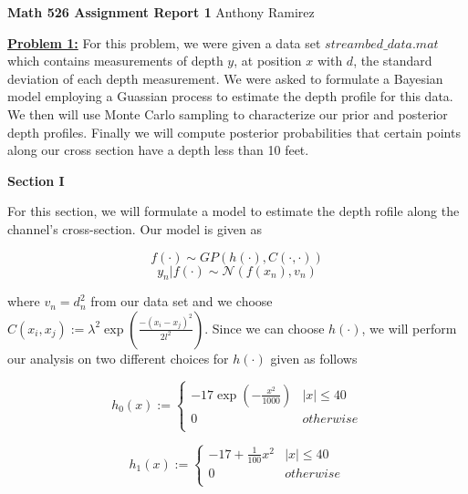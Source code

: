 \documentclass[12pt,leqno]{article}
\begin{document}
	
	\textbf{\large{Math 526} \hspace{0.5in}  \large{Assignment Report 1}}  \hspace{0.5in}  Anthony Ramirez
	
	\vspace{.25in}
	
	\textbf{\underline{Problem 1:}}
	For this problem, we were given a data set $streambed\_data.mat$ which contains measurements of depth $y$, at position $x$ with $d$, the standard deviation of each depth measurement. We were asked to formulate a Bayesian model employing a Guassian process to estimate the depth profile for this data. We then will use Monte Carlo sampling to characterize our prior and posterior depth profiles. Finally we will compute posterior probabilities that certain points along our cross section have a depth less than 10 feet.
	
	\textbf{Section I}
	
	For this section, we will formulate a model to estimate the depth rofile along the channel's cross-section. Our model is given as
	
	\[ f(\cdot) \sim GP\left( h(\cdot), C(\cdot,\cdot) \right) \]
	\[ y_n | f(\cdot) \sim \mathcal{N}(f(x_n),v_n) \]
	
	where $v_n=d_n^2$ from our data set and we choose $C(x_i,x_j):=\lambda^2 \exp\left( \frac{-(x_i-x_j)^2}{2l^2}\right)$. Since we can choose $h(\cdot)$, we will perform our analysis on two different choices for $h(\cdot)$ given as follows
	
	\[ h_0(x) := 
	\begin{cases}
		-17\exp\left( -\frac{x^2}{1000} \right) & |x| \leq 40 \\
		0 & otherwise \\
	\end{cases}
	 \]
	
		\[ h_1(x) := 
	\begin{cases}
		-17 + \frac{1}{100}x^2& |x| \leq 40 \\
		0 & otherwise \\
	\end{cases}
	\]
	
	

	
	
\end{document}
